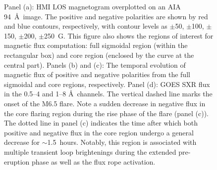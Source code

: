 \documentclass[twocolumn]{aastex6}
\begin{document}
\begin{figure}
\caption{Panel (a): HMI LOS magnetogram overplotted on an AIA 94~\AA~image. The positive and negative polarities are shown by red and blue contours, respectively, with contour levels as $\pm$50, $\pm$100, $\pm$150, $\pm$200, $\pm$250~G. This figure also shows the regions of interest for magnetic flux computation: full sigmoidal region (within the rectangular box) and core region (enclosed by the curve at the central part). Panels (b) and (c): The temporal evolution of magnetic flux of positive and negative polarities from the full sigmoidal and core regions, respectively. Panel (d): GOES SXR flux in the 0.5--4 and 1--8 \AA~channels. The vertical dashed line marks the onset of the M6.5 flare. Note a sudden decrease in negative flux in the core flaring region during the rise phase of the flare (panel (c)). The dotted line in panel (c) indicates the time after which both positive and negative flux in the core region undergo a general decrease for $\sim$1.5~hours. Notably, this region is associated with multiple transient loop brightenings during the extended pre-eruption phase as well as the flux rope activation.}
\label{fig4}
\end{figure}
\end{document}
